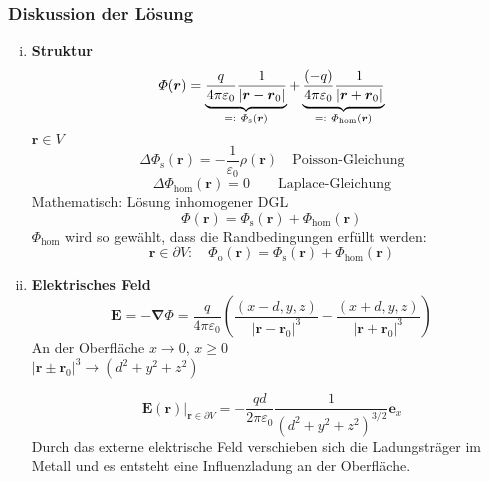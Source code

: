 \documentclass[titlepage,11pt,a4paper,ngerman]{report}
\newcommand*{\eqdef}{=\mathrel{\vcenter{\baselineskip0.5ex \lineskiplimit0pt \hbox{\scriptsize.}\hbox{\scriptsize.}}}}
\newcommand{\tx}[1]{\textrm{#1}}
\newcommand{\eofr}{\vec{E}(\vec{r})}
\newcommand{\pofr}{\Phi(\vec{r})}
\renewcommand{\Phi}{\varPhi}
\renewcommand{\vec}[1]{\boldsymbol{#1}}
\newcommand{\lcom}[1]{\color{MidnightBlue}#1\color{black}}
\renewcommand{\epsilon}{\varepsilon}
\begin{document}
\subsubsection{Diskussion der Lösung}
\begin{enumerate}[i)]
	\item \textbf{Struktur}
	$$\pofr = \underbrace{\frac{q}{4 \pi \epsilon_0} \frac{1}{|\vec{r}-\vec{r}_0|}}_{\eqdef\ \Phi_{\textrm{s}}(\vec{r})} + \underbrace{\frac{(-q)}{4 \pi \epsilon_0} \frac{1}{|\vec{r}+\vec{r}_0|}}_{\eqdef\ \Phi_{\textrm{hom}}(\vec{r})}$$ 
	$ \vec{r} \in V $
	\begin{equation*}
	\Delta \Phi_\tx{s}(\vec{r}) = - \frac{1}{\epsilon_0} \rho(\vec{r}) \quad \tx{Poisson-Gleichung}
	\end{equation*}
	\begin{equation*}
	\Delta \Phi_{\tx{hom}} (\vec{r}) = 0 \qquad \tx{Laplace-Gleichung}
	\end{equation*}
	Mathematisch: Lösung inhomogener DGL
	\begin{equation*}
	\pofr = \Phi_\tx{s}(\vec{r}) + \Phi_{\tx{hom}}(\vec{r})
	\end{equation*}
	$ \Phi_{\tx{hom}} $ wird so gewählt, dass die Randbedingungen erfüllt werden:
	\begin{equation*}
	\vec{r} \in \partial V: \quad \Phi_\tx{o} (\vec{r}) = \Phi_\tx{s}(\vec{r}) + \Phi_{\tx{hom}}(\vec{r})
	\end{equation*}	
	\item \textbf{Elektrisches Feld}
	\begin{equation*}
	\vec{E} = - \vec{\nabla} \Phi = \frac{q}{4 \pi \epsilon_0} \left(\frac{(x-d,y,z)}{|\vec{r} - \vec{r}_0|^3} - \frac{(x+d,y,z)}{|\vec{r} + \vec{r}_0|^3}\right)
	\end{equation*}
	An der Oberfläche $ x \to 0 $, $ x \ge 0 $\\
	$ |\vec{r} \pm \vec{r}_0|^3 \rightarrow (d^2 + y^2 + z^2) $\\
	\begin{minipage}{.5\linewidth}
		\begin{equation*}
		\eofr \bigg|_{\vec{r} \in \partial V} = - \frac{qd}{2 \pi \epsilon_0} \frac{1}{(d^2 + y^2 + z^2) ^{3/2}} \vec{e}_x
		\end{equation*}
		\lcom{Durch das externe elektrische Feld verschieben sich die Ladungsträger im Metall und es entsteht eine Influenzladung an der Oberfläche.}
	\end{minipage}%
	\begin{minipage}{.5\linewidth}

\end{minipage}
\end{enumerate}
\end{document}
